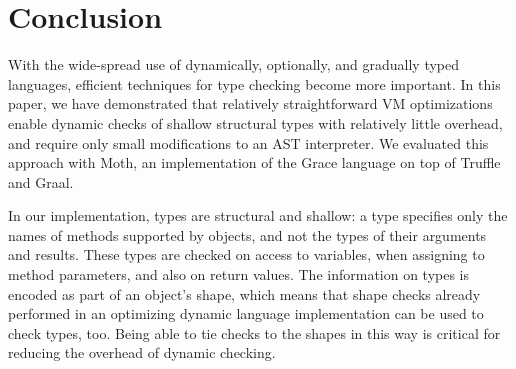 
\section{Conclusion}
\label{sec:conclusion}

With the wide-spread use of dynamically, optionally, and gradually
typed languages, efficient techniques for  type checking
become more important.
%
%
%
%
%
%
In this paper, we have demonstrated that relatively straightforward VM optimizations enable
dynamic checks of shallow structural types with relatively little
overhead, and require only small modifications to an AST interpreter.
We evaluated this approach with Moth, an implementation of the Grace language
on top of Truffle and Graal.
%
%
%

In our implementation, types are structural and shallow: a type
specifies only the names of methods supported by objects, and not
the types of their arguments and results.
These types are checked on access to variables,
when assigning to method parameters, and also on return values.
The information on types is encoded as part of an object's shape,
which means that shape checks already performed in an optimizing dynamic
language implementation can be used to check types, too. 
Being able to tie checks to the shapes in this way is critical for 
reducing the overhead of dynamic checking.
%

